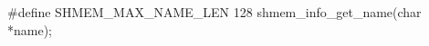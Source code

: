 \synC
#define SHMEM_MAX_NAME_LEN 128
shmem_info_get_name(char *name);

\synF



{
	
}
{
		\desR{}
	\notesB{}
}
		
\exampleB{
}
\eAPI

